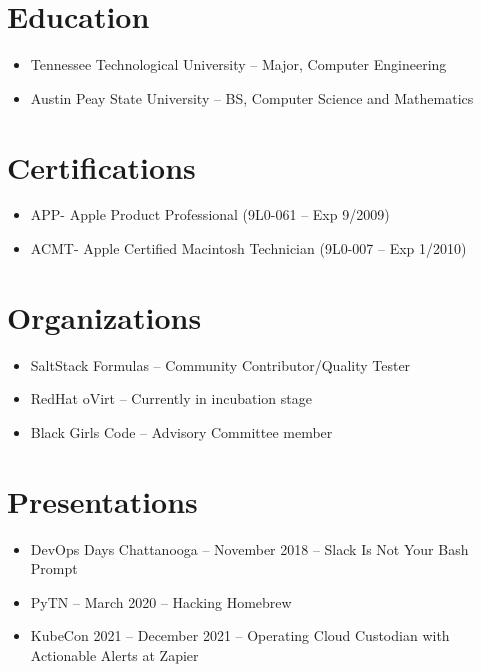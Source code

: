 \documentclass[a4paper,10pt]{article}
\begin{document}
\section*{Education}
\begin{itemize}
    \item Tennessee Technological University – Major, Computer Engineering
    \item Austin Peay State University – BS, Computer Science and Mathematics
\end{itemize}

\section*{Certifications}
\begin{itemize}
    \item APP- Apple Product Professional (9L0-061 – Exp 9/2009)
    \item ACMT- Apple Certified Macintosh Technician (9L0-007 – Exp 1/2010)
\end{itemize}

\section*{Organizations}
\begin{itemize}
    \item SaltStack Formulas – Community Contributor/Quality Tester
    \item RedHat oVirt – Currently in incubation stage
    \item Black Girls Code – Advisory Committee member
\end{itemize}

\section*{Presentations}
\begin{itemize}
    \item DevOps Days Chattanooga – November 2018 – Slack Is Not Your Bash Prompt
    \item PyTN – March 2020 – Hacking Homebrew
    \item KubeCon 2021 – December 2021 – Operating Cloud Custodian with Actionable Alerts at Zapier
\end{itemize}
\end{document}
